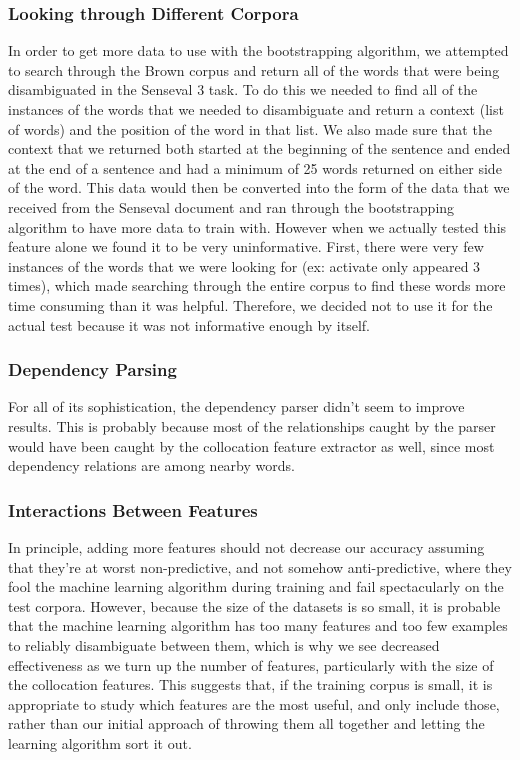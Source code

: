 \documentclass{article}
\begin{document}
\subsubsection{Looking through Different Corpora}

In order to get more data to use with the bootstrapping algorithm, we attempted
to search through the Brown corpus and return all of the words that were being
disambiguated in the Senseval 3 task.  To do this we needed to find all of the
instances of the words that we needed to disambiguate and return a context
(list of words) and the position of the word in that list.  We also made sure
that the context that we returned both started at the beginning of the
sentence and ended at the end of a sentence and had a minimum of 25 words
returned on either side of the word.  This data would then be converted into
the form of the data that we received from the Senseval document and ran
through the bootstrapping algorithm to have more data to train with.  However
when we actually tested this feature alone we found it to be very
uninformative.  First, there were very few instances of the words that we were
looking for (ex: activate only appeared 3 times), which made searching through
the entire corpus to find these words more time consuming than it was helpful.
Therefore, we decided not to use it for the actual test because it was not
informative enough by itself.


\subsubsection{Dependency Parsing}

For all of its sophistication, the dependency parser didn't seem to improve
results.  This is probably because most of the relationships caught by the
parser would have been caught by the collocation feature extractor as well,
since most dependency relations are among nearby words.

\subsubsection{Interactions Between Features}

In principle, adding more features should not decrease our accuracy assuming
that they're at worst non-predictive, and not somehow anti-predictive, where
they fool the machine learning algorithm during training and fail spectacularly
on the test corpora.  However, because the size of the datasets is so small, it
is probable that the machine learning algorithm has too many features and too
few examples to reliably disambiguate between them, which is why we see
decreased effectiveness as we turn up the number of features, particularly with
the size of the collocation features.  This suggests that, if the training
corpus is small, it is appropriate to study which features are the most useful,
and only include those, rather than our initial approach of throwing them all
together and letting the learning algorithm sort it out.
\end{document}
